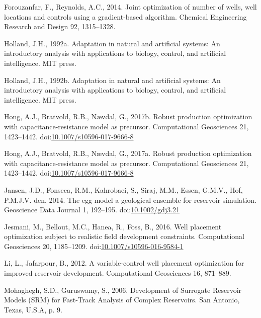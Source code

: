 \documentclass[]{elsarticle} %
\newlength{\cslhangindent}
\newenvironment{CSLReferences}[2] %
 {%
  \setlength{\parindent}{0pt}
  \ifodd #1 \everypar{\setlength{\hangindent}{\cslhangindent}}\ignorespaces\fi
  \ifnum #2 > 0
  \setlength{\parskip}{#2\baselineskip}
  \fi
 }%
 {}
\begin{document}
\begin{CSLReferences}{1}{0}
\leavevmode{}%
Forouzanfar, F., Reynolds, A.C., 2014. Joint optimization of number of wells, well locations and controls using a gradient-based algorithm. Chemical Engineering Research and Design 92, 1315--1328.

\leavevmode{}%
Holland, J.H., 1992a. Adaptation in natural and artificial systems: An introductory analysis with applications to biology, control, and artificial intelligence. MIT press.

\leavevmode{}%
Holland, J.H., 1992b. Adaptation in natural and artificial systems: An introductory analysis with applications to biology, control, and artificial intelligence. MIT press.

\leavevmode{}%
Hong, A.J., Bratvold, R.B., Nævdal, G., 2017b. Robust production optimization with capacitance-resistance model as precursor. Computational Geosciences 21, 1423--1442. doi:\href{https://doi.org/10.1007/s10596-017-9666-8}{10.1007/s10596-017-9666-8}

\leavevmode{}%
Hong, A.J., Bratvold, R.B., Nævdal, G., 2017a. Robust production optimization with capacitance-resistance model as precursor. Computational Geosciences 21, 1423--1442. doi:\href{https://doi.org/10.1007/s10596-017-9666-8}{10.1007/s10596-017-9666-8}

\leavevmode{}%
Jansen, J.D., Fonseca, R.M., Kahrobaei, S., Siraj, M.M., Essen, G.M.V., Hof, P.M.J.V. den, 2014. The egg model {\textendash} a geological ensemble for reservoir simulation. Geoscience Data Journal 1, 192--195. doi:\href{https://doi.org/10.1002/gdj3.21}{10.1002/gdj3.21}

\leavevmode{}%
Jesmani, M., Bellout, M.C., Hanea, R., Foss, B., 2016. Well placement optimization subject to realistic field development constraints. Computational Geosciences 20, 1185--1209. doi:\href{https://doi.org/10.1007/s10596-016-9584-1}{10.1007/s10596-016-9584-1}

\leavevmode{}%
Li, L., Jafarpour, B., 2012. A variable-control well placement optimization for improved reservoir development. Computational Geosciences 16, 871--889.

\leavevmode{}%
Mohaghegh, S.D., Guruswamy, S., 2006. Development of Surrogate Reservoir Models (SRM) for Fast-Track Analysis of Complex Reservoirs. San Antonio, Texas, U.S.A, p. 9.


\end{CSLReferences}
\end{document}

